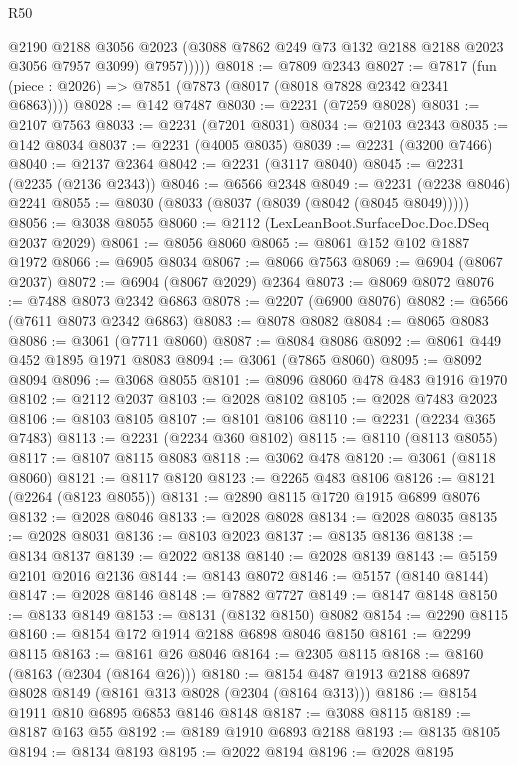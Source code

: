 \begin{lexlean}{R50}
\begin{coremodule}
              @2190
              @2188
              @3056
              @2023
              (@3088 @7862 @249 @73 @132 @2188 @2188 @2023 @3056 @7957 @3099)
              @7957)))))
@8018 := @7809 @2343
@8027 := @7817 (fun (piece : @2026) => @7851 (@7873 (@8017 (@8018 @7828 @2342 @2341 @6863))))
@8028 := @142 @7487
@8030 := @2231 (@7259 @8028)
@8031 := @2107 @7563
@8033 := @2231 (@7201 @8031)
@8034 := @2103 @2343
@8035 := @142 @8034
@8037 := @2231 (@4005 @8035)
@8039 := @2231 (@3200 @7466)
@8040 := @2137 @2364
@8042 := @2231 (@3117 @8040)
@8045 := @2231 (@2235 (@2136 @2343))
@8046 := @6566 @2348
@8049 := @2231 (@2238 @8046) @2241
@8055 := @8030 (@8033 (@8037 (@8039 (@8042 (@8045 @8049)))))
@8056 := @3038 @8055
@8060 := @2112 (LexLeanBoot.SurfaceDoc.Doc.DSeq @2037 @2029)
@8061 := @8056 @8060
@8065 := @8061 @152 @102 @1887 @1972
@8066 := @6905 @8034
@8067 := @8066 @7563
@8069 := @6904 (@8067 @2037)
@8072 := @6904 (@8067 @2029) @2364
@8073 := @8069 @8072
@8076 := @7488 @8073 @2342 @6863
@8078 := @2207 (@6900 @8076)
@8082 := @6566 (@7611 @8073 @2342 @6863)
@8083 := @8078 @8082
@8084 := @8065 @8083
@8086 := @3061 (@7711 @8060)
@8087 := @8084 @8086
@8092 := @8061 @449 @452 @1895 @1971 @8083
@8094 := @3061 (@7865 @8060)
@8095 := @8092 @8094
@8096 := @3068 @8055
@8101 := @8096 @8060 @478 @483 @1916 @1970
@8102 := @2112 @2037
@8103 := @2028 @8102
@8105 := @2028 @7483 @2023
@8106 := @8103 @8105
@8107 := @8101 @8106
@8110 := @2231 (@2234 @365 @7483)
@8113 := @2231 (@2234 @360 @8102)
@8115 := @8110 (@8113 @8055)
@8117 := @8107 @8115 @8083
@8118 := @3062 @478
@8120 := @3061 (@8118 @8060)
@8121 := @8117 @8120
@8123 := @2265 @483 @8106
@8126 := @8121 (@2264 (@8123 @8055))
@8131 := @2890 @8115 @1720 @1915 @6899 @8076
@8132 := @2028 @8046
@8133 := @2028 @8028
@8134 := @2028 @8035
@8135 := @2028 @8031
@8136 := @8103 @2023
@8137 := @8135 @8136
@8138 := @8134 @8137
@8139 := @2022 @8138
@8140 := @2028 @8139
@8143 := @5159 @2101 @2016 @2136
@8144 := @8143 @8072
@8146 := @5157 (@8140 @8144)
@8147 := @2028 @8146
@8148 := @7882 @7727
@8149 := @8147 @8148
@8150 := @8133 @8149
@8153 := @8131 (@8132 @8150) @8082
@8154 := @2290 @8115
@8160 := @8154 @172 @1914 @2188 @6898 @8046 @8150
@8161 := @2299 @8115
@8163 := @8161 @26 @8046
@8164 := @2305 @8115
@8168 := @8160 (@8163 (@2304 (@8164 @26)))
@8180 := @8154 @487 @1913 @2188 @6897 @8028 @8149 (@8161 @313 @8028 (@2304 (@8164 @313)))
@8186 := @8154 @1911 @810 @6895 @6853 @8146 @8148
@8187 := @3088 @8115
@8189 := @8187 @163 @55
@8192 := @8189 @1910 @6893 @2188
@8193 := @8135 @8105
@8194 := @8134 @8193
@8195 := @2022 @8194
@8196 := @2028 @8195

\end{coremodule}
\end{lexlean}

